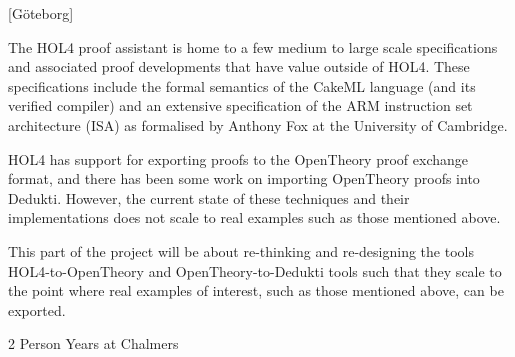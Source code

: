 [G\"oteborg]

The HOL4 proof assistant is home to a few medium to large scale
specifications and associated proof developments that have value
outside of HOL4. These specifications include the formal semantics of
the CakeML language (and its verified compiler) and an extensive
specification of the ARM instruction set architecture (ISA) as
formalised by Anthony Fox at the University of Cambridge.

HOL4 has support for exporting proofs to the OpenTheory proof exchange
format, and there has been some work on importing OpenTheory proofs
into Dedukti. However, the current state of these techniques and their
implementations does not scale to real examples such as those
mentioned above.

This part of the project will be about re-thinking and re-designing
the tools HOL4-to-OpenTheory and OpenTheory-to-Dedukti tools such that
they scale to the point where real examples of interest, such as those
mentioned above, can be exported.

2 Person Years at Chalmers

